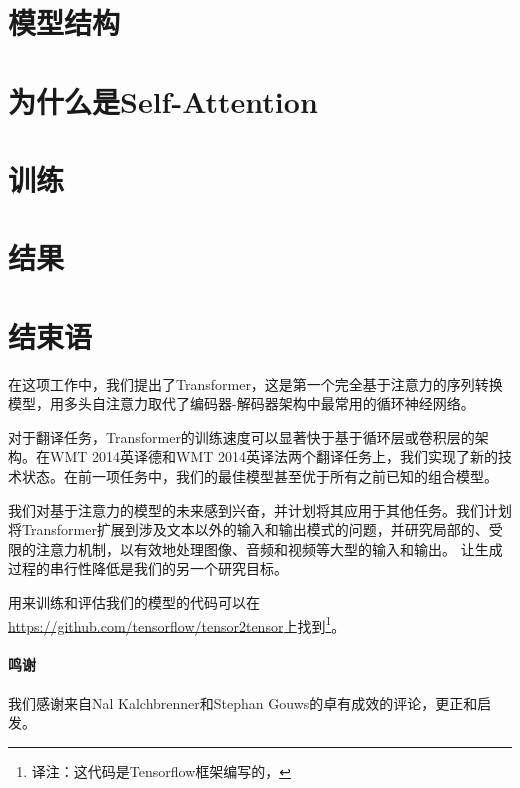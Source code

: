 \documentclass{article}
\begin{document}


\section{模型结构}

 
\section{为什么是Self-Attention}


\section{训练}

 
\section{结果} \label{sec:results}


\section{结束语}
在这项工作中，我们提出了Transformer，这是第一个完全基于注意力的序列转换模型，用多头自注意力取代了编码器-解码器架构中最常用的循环神经网络。

对于翻译任务，Transformer的训练速度可以显著快于基于循环层或卷积层的架构。在WMT 2014英译德和WMT 2014英译法两个翻译任务上，我们实现了新的技术状态。在前一项任务中，我们的最佳模型甚至优于所有之前已知的组合模型。%

我们对基于注意力的模型的未来感到兴奋，并计划将其应用于其他任务。我们计划将Transformer扩展到涉及文本以外的输入和输出模式的问题，并研究局部的、受限的注意力机制，以有效地处理图像、音频和视频等大型的输入和输出。
让生成过程的串行性降低是我们的另一个研究目标。

用来训练和评估我们的模型的代码可以在\url{https://github.com/tensorflow/tensor2tensor}上找到\footnote{译注：这代码是Tensorflow框架编写的，}。

\paragraph{鸣谢} 我们感谢来自Nal Kalchbrenner和Stephan Gouws的卓有成效的评论，更正和启发。
\end{document}
